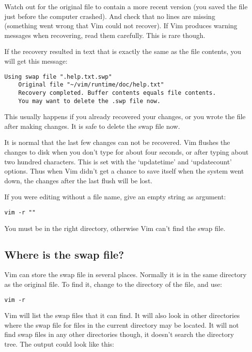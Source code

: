 Watch out for the original file to contain a more recent version (you saved the file just before the computer crashed).
And check that no lines are missing (something went wrong that Vim could not recover).
If Vim produces warning messages when recovering, read them carefully.
This is rare though.

If the recovery resulted in text that is exactly the same as the file contents, you will get this message:

\begin{Verbatim}[samepage=true]
    Using swap file ".help.txt.swp" 
    Original file "~/vim/runtime/doc/help.txt" 
    Recovery completed. Buffer contents equals file contents. 
    You may want to delete the .swp file now. 
\end{Verbatim}

This usually happens if you already recovered your changes, or you wrote the file after making changes.
It is safe to delete the swap file now.

It is normal that the last few changes can not be recovered.
Vim flushes the changes to disk when you don't type for about four seconds, or after typing about two hundred characters.
This is set with the `updatetime' and `updatecount' options.
Thus when Vim didn't get a chance to save itself when the system went down, the changes after the last flush will be lost.

If you were editing without a file name, give an empty string as argument:

\begin{Verbatim}[samepage=true]
 vim -r ""
\end{Verbatim}

You must be in the right directory, otherwise Vim can't find the swap file.
\subsection{Where is the swap file?}
Vim can store the swap file in several places.
Normally it is in the same directory as the original file.
To find it, change to the directory of the file, and use:

\begin{Verbatim}[samepage=true]
 vim -r
\end{Verbatim}

Vim will list the swap files that it can find.
It will also look in other directories where the swap file for files in the current directory may be located.
It will not find swap files in any other directories though, it doesn't search the directory tree.
The output could look like this:

